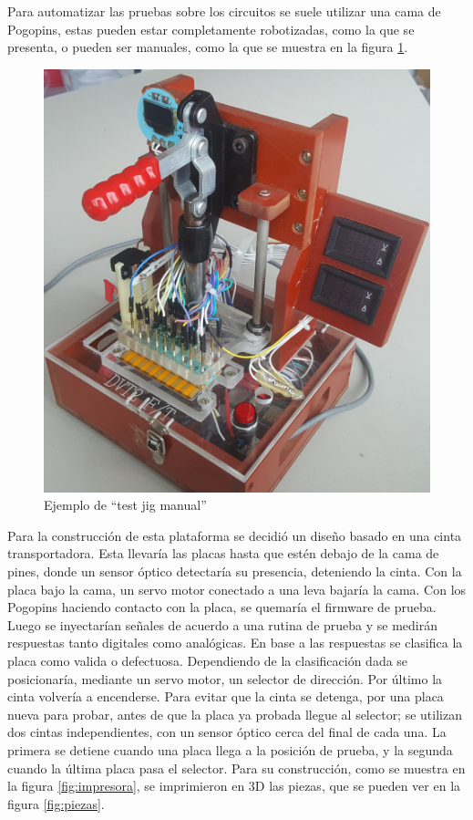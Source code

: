 \documentclass[12pt,letterpaper]{article}     %
\begin{document}
Para automatizar las pruebas sobre los circuitos se suele utilizar una cama de Pogopins, 
estas pueden estar completamente robotizadas, como la que se presenta, o pueden ser manuales,
como la que se muestra en la figura \ref{fig:pogojig}.

\begin{figure}[!ht]
\centering
\includegraphics[scale=0.1]{imagenes/pogojig.jpg}
\caption{Ejemplo de ``test jig manual''}
\label{fig:pogojig}
\end{figure}

Para la construcción de esta plataforma se decidió un diseño basado en una cinta transportadora.
Esta llevaría las placas hasta que estén debajo de la cama de pines, donde un sensor óptico detectaría 
su presencia, deteniendo la cinta. Con la placa bajo la cama, un servo motor conectado a una leva 
bajaría la cama. Con los Pogopins haciendo contacto con la placa, se quemaría el firmware de prueba.
Luego se inyectarían señales de acuerdo a una rutina de prueba y se medirán respuestas tanto digitales
como analógicas. En base a las respuestas se clasifica la placa como valida o defectuosa. Dependiendo 
de la clasificación dada se posicionaría, mediante un servo motor, un selector de dirección. Por último
la cinta volvería a encenderse. Para evitar que la cinta se detenga, por una placa nueva para probar,
antes de que la placa ya probada llegue al selector; se utilizan dos cintas independientes, 
con un sensor óptico cerca del final de cada una. La primera se detiene cuando una placa llega a la
posición de prueba, y la segunda cuando la última placa pasa el selector.
Para su construcción, como se muestra en la figura \ref{fig:impresora}, se imprimieron en 3D las piezas,
que se pueden ver en la figura \ref{fig:piezas}.
\end{document}
